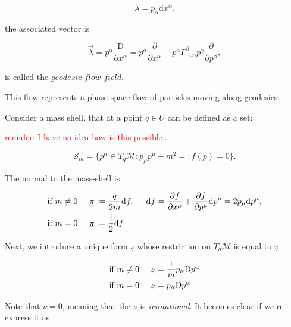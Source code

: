 \begin{equation}
\underline{\lambda} = p_{\alpha} \text{d}x^{\alpha}.
\end{equation}

the associated vector is 

\begin{equation}
\vec{\lambda} = p^{\alpha} \frac{\text{D}}{\partial x^{\alpha}} = p^{\alpha}\frac{\partial}{\partial x^{\alpha}} - p^{\alpha}{\Gamma^{\beta}}_{\alpha\gamma}p^{\gamma}\frac{\partial}{\partial p^{\beta}},
\end{equation}

is called the $\textit{geodesic flow field}$.

This flow represents a phase-space flow of particles moving along geodesics.

Consider a mass shell, that at a point $q\in U$ can be defined as a set:

\textcolor{red}{remider: I have no idea how is this possible...}

\begin{equation}
\mathcal{S}_m = \big\{ p^{\alpha}\in T_q\mathcal{M}: p_{\mu}p^{\mu}+m^2 =:f(p) = 0 \big\}.
\end{equation}

The normal to the mass-shell is 

\begin{align}
\text{if } m &\neq 0 \hspace{5mm} \underline{\pi}:=\frac{q}{2m}\text{d}f, \hspace{5mm} \text{d}f = \frac{\partial f}{\partial x^{\mu}} + \frac{\partial f}{\partial p^{\mu}}\text{d}p^{\mu} = 2p_{\mu}\text{d}p^{\mu}, \\
\text{if } m &= 0 \hspace{5mm} \underline{\pi}:=\frac{1}{2}\text{d}f
\end{align}

Next, we introduce a unique form $\underline{\nu}$ whose restriction on $T_q\mathcal{M}$ is equal to $\underline{\pi}$. 

\begin{align}
\text{if } m &\neq 0 \hspace{5mm} \underline{\nu} = \frac{1}{m}p_{\alpha}\text{D}p^{\alpha} \\
\text{if } m &= 0 \hspace{5mm} \underline{\nu} = p_{\alpha}\text{D}p^{\alpha}
\end{align} 

Note that $\underline{\nu} = 0$, meaning that the $\underline{\nu}$ is \textit{irrotational}. 
It becomes clear if we re-express it as 

